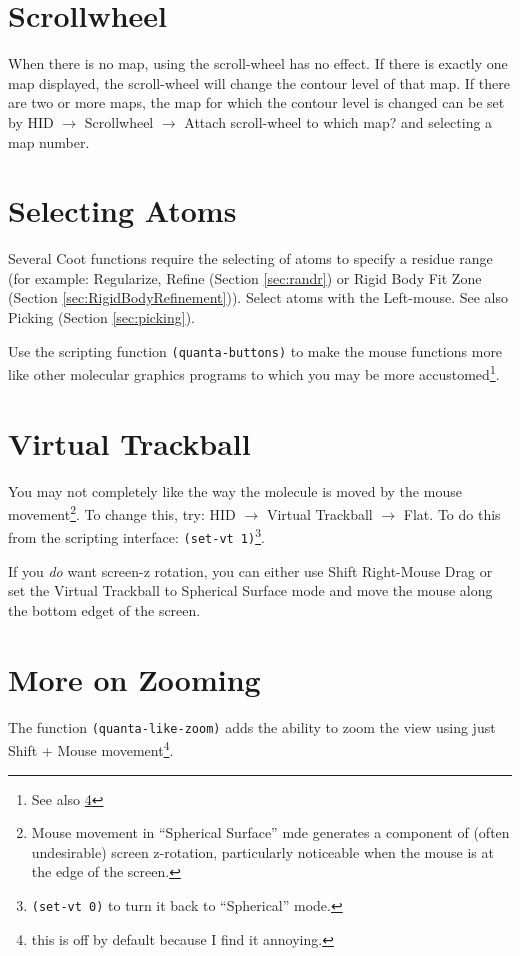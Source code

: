 \documentclass{book}
\begin{document}
\vspace{3mm}

\section{Scrollwheel}
When there is no map, using the scroll-wheel has no effect.  If there
is exactly one map displayed,  the scroll-wheel
will change the contour level of that map.  If there are two or more
maps, the map for which the contour level is changed can be set by
\textsf{HID $\rightarrow$ Scrollwheel $\rightarrow$ Attach scroll-wheel
  to which map?} and selecting a map number.

\section{Selecting Atoms}
Several Coot functions require the selecting of atoms to specify a
residue range (for example: Regularize, Refine (Section
\ref{sec:randr}) or Rigid Body Fit Zone (Section
\ref{sec:RigidBodyRefinement})).  Select atoms with the Left-mouse.
See also Picking (Section \ref{sec:picking}).

Use the scripting function
\texttt{(quanta-buttons)} to make the mouse
functions more like other molecular graphics programs to which you may
be more accustomed\footnote{See also \ref{sec:quanta-zooming}}.

\section{Virtual Trackball}
 You may not completely like the way the
molecule is moved by the mouse movement\footnote{Mouse movement in
  ``Spherical Surface'' mde generates a component of (often
  undesirable) screen z-rotation, particularly noticeable when the
  mouse is at the edge of the screen.}.  To change this, try:
\textsf{HID $\rightarrow$ Virtual Trackball $\rightarrow$ Flat}.  To
do this from the scripting interface: \texttt{(set-vt
  1)}\footnote{\texttt{(set-vt 0)} to turn it back to ``Spherical''
  mode.}.

If you \emph{do} want 
screen-z rotation, you can either use Shift Right-Mouse Drag or set
the Virtual Trackball to Spherical Surface mode and move the mouse
along the bottom edget of the screen.

\section{More on Zooming}
\label{sec:quanta-zooming}
The function \texttt{(quanta-like-zoom)} adds the ability to zoom the
view using just Shift + Mouse movement\footnote{this is off by default
  because I find it annoying.}.
\end{document}
